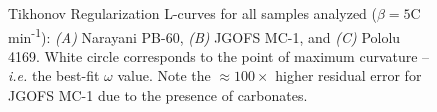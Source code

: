 \begin{figure}[p]
	\caption[Tikhonov Regularization L-curves for all samples analyzed]{Tikhonov Regularization L-curves for all samples analyzed ($\beta = 5$\textdegree C min\textsuperscript{-1}): \textit{(A)} Narayani PB-60, \textit{(B)} JGOFS MC-1, and \textit{(C)} Pololu 4169. White circle corresponds to the point of maximum curvature -- \textit{i.e.} the best-fit $\omega$ value. Note the $\approx 100 \times$ higher residual error for JGOFS MC-1 due to the presence of carbonates.}
	\label{Ch3Fig:6} 
\end{figure}

